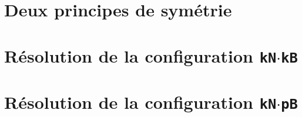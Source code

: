 \documentclass[12pt]{amsart}
\begin{document}
\section{Deux principes de symétrie}






\section{Résolution de la configuration \texttt{kN$\cdot$kB}}







\section{Résolution de la configuration \texttt{kN$\cdot$pB}}





%
%
%
%

%
%
%
%
%
%
%
%
%
%
\end{document}
